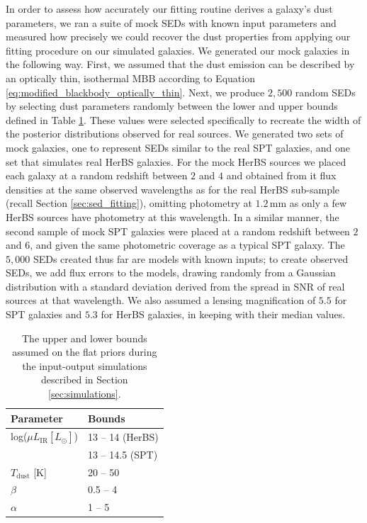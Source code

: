In order to assess how accurately our fitting routine derives a galaxy's dust parameters, we ran a suite of mock SEDs with known input parameters and measured how precisely we could recover the dust properties from applying our fitting procedure on our simulated galaxies. We generated our mock galaxies in the following way. First, we assumed that the dust emission can be described by an optically thin, isothermal MBB according to Equation \ref{eq:modified_blackbody_optically_thin}. Next, we produce $2,500$ random SEDs by selecting dust parameters randomly between the lower and upper bounds defined in Table \ref{tab:simulation_inputs}. These values were selected specifically to recreate the width of the posterior distributions observed for real sources. We generated two sets of mock galaxies, one to represent SEDs similar to the real SPT galaxies, and one set that simulates real HerBS galaxies. For the mock HerBS sources we placed each galaxy at a random redshift between $2$ and $4$ and obtained from it flux densities at the same observed wavelengths as for the real HerBS sub-sample (recall Section \ref{sec:sed_fitting}), omitting photometry at $1.2\,$mm as only a few HerBS sources have photometry at this wavelength. In a similar manner, the second sample of mock SPT galaxies were placed at a random redshift between $2$ and $6$, and given the same photometric coverage as a typical SPT galaxy. The $5,000$ SEDs created thus far are models with known inputs; to create observed SEDs, we add flux errors to the models, drawing randomly from a Gaussian distribution with a standard deviation derived from the spread in SNR of real sources at that wavelength. We also assumed a lensing magnification of $5.5$ for SPT galaxies and $5.3$ for HerBS galaxies, in keeping with their median values.

\begin{table}
    \centering
    \begin{tabular}{p{3cm}|p{3cm}}
        \hline
		\hline
        Parameter & Bounds \\
        \hline
        \hline
        log($\mu L_{\textrm{IR}} [L_{\odot}]$) & 13 -- 14 (HerBS) \\
        & 13 -- 14.5 (SPT) \\
		$T_{\textrm{dust}}$ [K] & 20 -- 50 \\
		$\beta$  & 0.5 -- 4 \\
		$\alpha$  & 1 -- 5 \\
        \hline
    \end{tabular}
    \caption[Bounds on the input parameter ranges for mock galaxy simulations]{The upper and lower bounds assumed on the flat priors during the input-output simulations described in Section \ref{sec:simulations}.}
    \label{tab:simulation_inputs}
\end{table}

